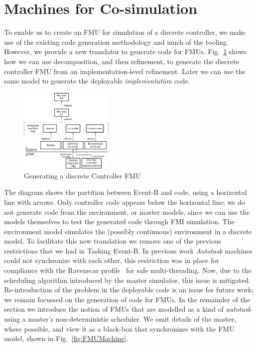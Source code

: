 \documentclass{llncs}%
\begin{document}
%
\section{Machines for Co-simulation}\label{FMUMachines}
To enable us to create an FMU for simulation of a discrete controller, we make use of the existing code generation methodology and much of the tooling. However, we provide a new translator to generate code for FMUs. Fig.~\ref{fig:devel} shows how we can use decomposition, and then refinement, to generate the discrete controller FMU from an implementation-level refinement. Later we can use the same model to generate the deployable \emph{implementation} code.
%
\begin{figure}
\centering
\includegraphics[width=0.4\textwidth]{devel.png}
\caption{Generating a discrete Controller FMU}
\label{fig:devel}
\end{figure}
The diagram shows the partition between Event-B and code, using a horizontal line with arrows. Only controller code appears below the horizontal line; we do not generate code from the environment, or master models, since we can use the models themselves to test the generated code through FMI simulation. The environment model simulates the (possibly continuous) environment in a discrete model. To facilitate this new translation we remove one of the previous restrictions that we had in Tasking Event-B. In previous work \emph{Autotask} machines could not synchronize with each other, this restriction was in place for compliance with the Ravenscar profile~\cite{Burns1999}  for safe multi-threading. Now, due to the scheduling algorithm introduced by the master simulator, this issue is mitigated. Re-introduction of the problem in the deployable code is an issue for future work; we remain focussed on the generation of code for FMUs. In the remainder of the section we introduce the notion of FMUs that are modelled as a kind of \emph{autotask} using a master's non-deterministic scheduler. We omit details of the master, where possible, and view it as a black-box that synchronizes with the FMU model, shown in Fig.~\ref{fig:FMUMachine}.  
\end{document}
